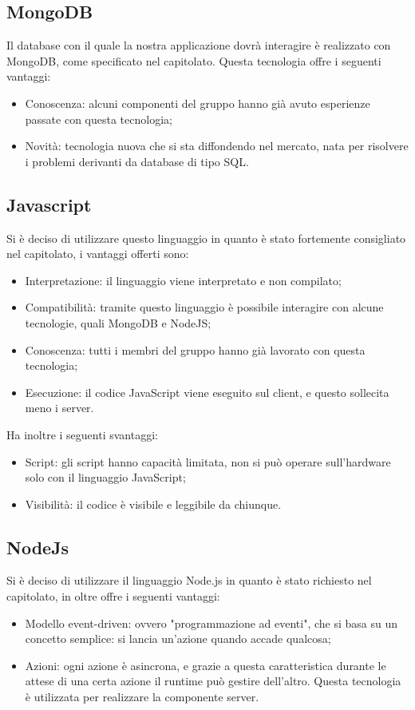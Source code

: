 \subsection{MongoDB}
Il database con il quale la nostra applicazione dovrà interagire è realizzato con MongoDB, come specificato nel capitolato. Questa tecnologia offre i seguenti vantaggi:
\begin{itemize}
\item Conoscenza: alcuni componenti del gruppo hanno già avuto esperienze passate con questa tecnologia;
\item Novità: tecnologia nuova che si sta diffondendo nel mercato, nata per risolvere i problemi derivanti da database di tipo SQL.
\end{itemize}

\subsection{Javascript}
Si è deciso di utilizzare questo linguaggio in quanto è stato fortemente consigliato nel capitolato, i vantaggi offerti sono:
\begin{itemize}
\item Interpretazione: il linguaggio viene interpretato e non compilato;
\item Compatibilità: tramite questo linguaggio è possibile interagire con alcune tecnologie, quali MongoDB e NodeJS;
\item Conoscenza: tutti i membri del gruppo hanno già lavorato con questa tecnologia;
\item Esecuzione: il codice JavaScript viene eseguito sul client, e questo sollecita meno i server.
\end{itemize}
Ha inoltre i seguenti svantaggi:
\begin{itemize}
\item Script: gli script hanno capacità limitata, non si può operare sull'hardware solo con il linguaggio JavaScript;
\item Visibilità: il codice è visibile e leggibile da chiunque.
\end{itemize}

\subsection{NodeJs}
Si è deciso di utilizzare il linguaggio Node.js in quanto è stato richiesto nel capitolato, in oltre offre i seguenti vantaggi:
\begin{itemize}
\item Modello event-driven: ovvero "programmazione ad eventi", che si basa su un concetto semplice: si lancia un'azione quando accade qualcosa;
\item Azioni: ogni azione è asincrona, e grazie a questa caratteristica durante le attese di una certa azione il runtime può gestire dell'altro. Questa tecnologia è utilizzata per realizzare la componente server.
\end{itemize}

